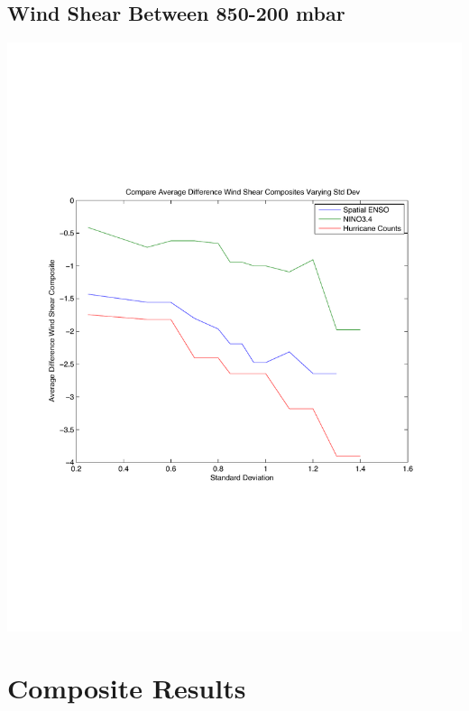 \documentclass[11pt]{article}
\begin{document}
\subsection{Wind Shear Between 850-200 mbar}
\includegraphics[scale=.6]{images/varyingStdDevForCompositesWindShear.pdf}

\section{Composite Results}
\end{document}
